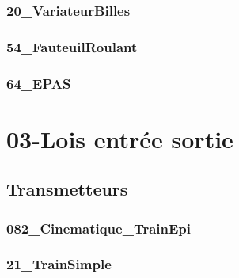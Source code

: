 \subsection{20\_VariateurBilles}
\graphicspath{{../02-Modélisation des mécanismes/TD/Systèmes/20_VariateurBilles/images/}{../02-Modélisation des mécanismes/TD/Systèmes/20_VariateurBilles/}{../Style/png/}}


\subsection{54\_FauteuilRoulant}
\graphicspath{{../02-Modélisation des mécanismes/TD/Systèmes/54_FauteuilRoulant/images/}{../02-Modélisation des mécanismes/TD/Systèmes/54_FauteuilRoulant/}{../Style/png/}}


\subsection{64\_EPAS}
\graphicspath{{../02-Modélisation des mécanismes/TD/Systèmes/64_EPAS/images/}{../02-Modélisation des mécanismes/TD/Systèmes/64_EPAS/}{../Style/png/}}


\clearpage
\chapter{03-Lois entrée sortie}

\section{Transmetteurs}

\subsection{082\_Cinematique\_TrainEpi}
\graphicspath{{../03-Lois entrée sortie/TD/Transmetteurs/082_Cinematique_TrainEpi/images/}{../03-Lois entrée sortie/TD/Transmetteurs/082_Cinematique_TrainEpi/}{../Style/png/}}


\subsection{21\_TrainSimple}
\graphicspath{{../03-Lois entrée sortie/TD/Transmetteurs/21_TrainSimple/images/}{../03-Lois entrée sortie/TD/Transmetteurs/21_TrainSimple/}{../Style/png/}}


